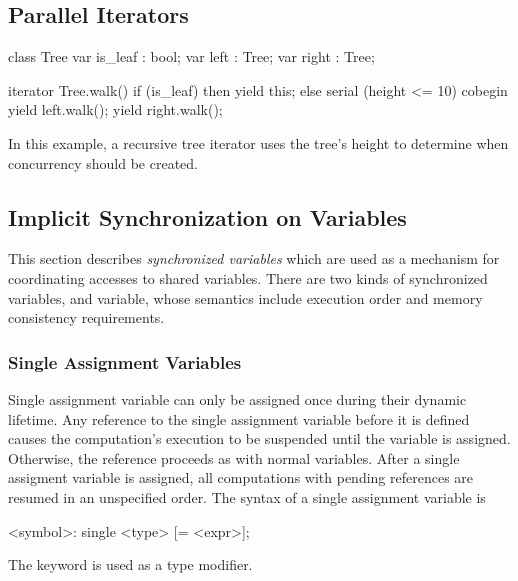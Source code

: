\subsection{Parallel Iterators}
\label{Parallel_Iterators}

\begin{example}
\begin{chapel}      
class Tree {
  var is_leaf : bool;
  var left    : Tree;
  var right   : Tree;
}

iterator Tree.walk() {
  if (is_leaf) then
    yield this;
  else
    serial (height <= 10) cobegin {
      yield left.walk();
      yield right.walk();
    }
}
\end{chapel}
In this example, a recursive tree iterator uses the tree's height to
determine when concurrency should be created.
\end{example}


\subsection{Implicit Synchronization on Variables}
\label{Implicit_Synchronization_on_Variables}

This section describes {\em synchronized variables} which are used as
a mechanism for coordinating accesses to shared variables. There are
two kinds of synchronized variables,  and 
variable, whose semantics include execution order and memory
consistency requirements.



\subsubsection{Single Assignment Variables}
\label{Single_Assignment_Variables}

Single assignment variable can only be assigned once during their
dynamic lifetime.  Any reference to the single assignment variable
before it is defined causes the computation's execution to be
suspended until the variable is assigned. Otherwise, the reference
proceeds as with normal variables.  After a single assigment variable is
assigned, all computations with pending references are resumed in an
unspecified order. The syntax of a single assignment variable is
\begin{chapel}
[var] <symbol>: single <type> [= <expr>];
\end{chapel}
The keyword  is used as a type modifier. 

